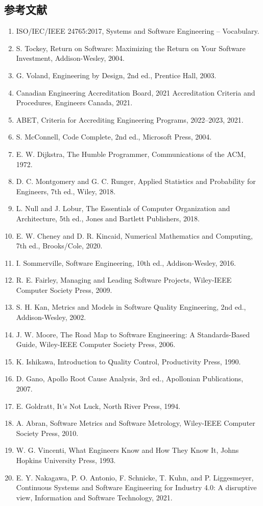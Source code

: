 \documentclass[a4paper,11pt]{ltjsarticle}
\numberwithin{figure}{section}
\numberwithin{table}{section}
\begin{document}
\subsection{参考文献}
\begin{enumerate}[leftmargin=2em]
\item ISO/IEC/IEEE 24765:2017, Systems and Software Engineering – Vocabulary.
\item S. Tockey, Return on Software: Maximizing the Return on Your Software Investment, Addison-Wesley, 2004.
\item G. Voland, Engineering by Design, 2nd ed., Prentice Hall, 2003.
\item Canadian Engineering Accreditation Board, 2021 Accreditation Criteria and Procedures, Engineers Canada, 2021.
\item ABET, Criteria for Accrediting Engineering Programs, 2022–2023, 2021.
\item S. McConnell, Code Complete, 2nd ed., Microsoft Press, 2004.
\item E. W. Dijkstra, The Humble Programmer, Communications of the ACM, 1972.
\item D. C. Montgomery and G. C. Runger, Applied Statistics and Probability for Engineers, 7th ed., Wiley, 2018.
\item L. Null and J. Lobur, The Essentials of Computer Organization and Architecture, 5th ed., Jones and Bartlett Publishers, 2018.
\item E. W. Cheney and D. R. Kincaid, Numerical Mathematics and Computing, 7th ed., Brooks/Cole, 2020.
\item I. Sommerville, Software Engineering, 10th ed., Addison-Wesley, 2016.
\item R. E. Fairley, Managing and Leading Software Projects, Wiley-IEEE Computer Society Press, 2009.
\item S. H. Kan, Metrics and Models in Software Quality Engineering, 2nd ed., Addison-Wesley, 2002.
\item J. W. Moore, The Road Map to Software Engineering: A Standards-Based Guide, Wiley-IEEE Computer Society Press, 2006.
\item K. Ishikawa, Introduction to Quality Control, Productivity Press, 1990.
\item D. Gano, Apollo Root Cause Analysis, 3rd ed., Apollonian Publications, 2007.
\item E. Goldratt, It’s Not Luck, North River Press, 1994.
\item A. Abran, Software Metrics and Software Metrology, Wiley-IEEE Computer Society Press, 2010.
\item W. G. Vincenti, What Engineers Know and How They Know It, Johns Hopkins University Press, 1993.
\item E. Y. Nakagawa, P. O. Antonio, F. Schnicke, T. Kuhn, and P. Liggesmeyer, Continuous Systems and Software Engineering for Industry 4.0: A disruptive view, Information and Software Technology, 2021.
\end{enumerate}
\end{document}
